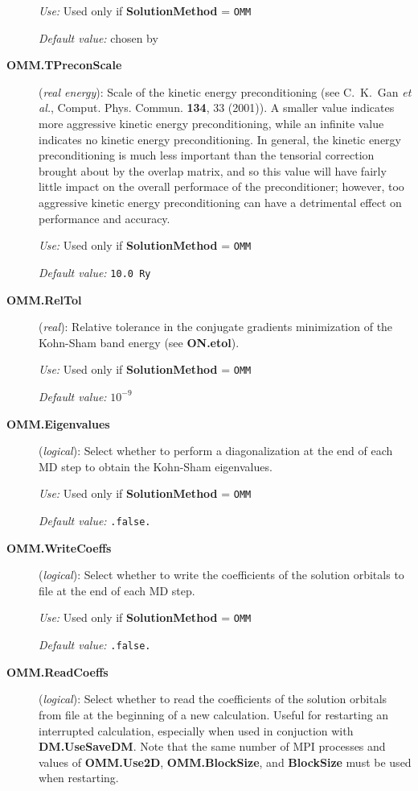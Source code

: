 \begin{description}
\textit{Use:} Used only if \textbf{SolutionMethod} = \texttt{OMM}

\textit{Default value:} chosen by \siesta\

\item[\textbf{OMM.TPreconScale}] (\textit{real energy}):
Scale of the kinetic energy preconditioning (see C.~K.~Gan \emph{et al.}, Comput. Phys. Commun.
\textbf{134}, 33 (2001)). A smaller value indicates more aggressive kinetic energy preconditioning,
while an infinite value indicates no kinetic energy preconditioning. In general, the kinetic
energy preconditioning is much less important than the tensorial correction brought about by
the overlap matrix, and so this value will have fairly little impact on the overall performace
of the preconditioner; however, too aggressive kinetic energy preconditioning can have a
detrimental effect on performance and accuracy.

\textit{Use:} Used only if \textbf{SolutionMethod} = \texttt{OMM}

\textit{Default value:} \texttt{10.0 Ry}

\item[\textbf{OMM.RelTol}] (\textit{real}):
Relative tolerance in the conjugate gradients minimization of the Kohn-Sham band energy (see
\textbf{ON.etol}).

\textit{Use:} Used only if \textbf{SolutionMethod} = \texttt{OMM}

\textit{Default value:} $10^{-9}$

\item[\textbf{OMM.Eigenvalues}] (\textit{logical}):
Select whether to perform a diagonalization at the end of each MD step to obtain the Kohn-Sham
eigenvalues.

\textit{Use:} Used only if \textbf{SolutionMethod} = \texttt{OMM}

\textit{Default value:} \texttt{.false.}

\item[\textbf{OMM.WriteCoeffs}] (\textit{logical}):
Select whether to write the coefficients of the solution orbitals to file at the end of each MD
step.

\textit{Use:} Used only if \textbf{SolutionMethod} = \texttt{OMM}

\textit{Default value:} \texttt{.false.}

\item[\textbf{OMM.ReadCoeffs}] (\textit{logical}):
Select whether to read the coefficients of the solution orbitals from file at the beginning of
a new calculation. Useful for restarting an interrupted calculation, especially when used in
conjuction with \textbf{DM.UseSaveDM}. Note that the same number of MPI processes and values of
\textbf{OMM.Use2D}, \textbf{OMM.BlockSize}, and \textbf{BlockSize} must be used when restarting.


\end{description}
